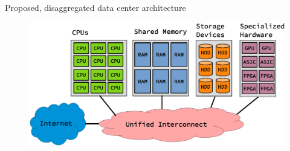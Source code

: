 \begin{frame}

Proposed, disaggregated data center architecture


\begin{figure}
	\centering
\includegraphics[scale=0.5]{./background/dc_architectures_disaggregated.eps}
\end{figure}



\end{frame}













